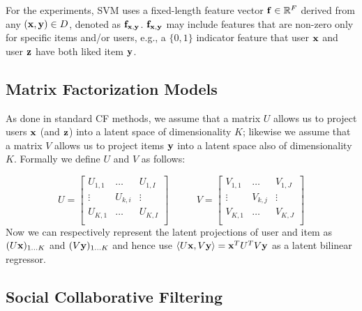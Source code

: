 For the experiments, SVM uses a fixed-length feature vector
$\mathbf{f} \in \mathbb{R}^F$ derived from any $(\mathbf{x},\mathbf{y}) \in D$, denoted
as $\mathbf{f}_{\mathbf{x},\mathbf{y}}$.  $\mathbf{f}_{\mathbf{x},\mathbf{y}}$ may include features
that are non-zero only for specific items and/or users, e.g., a $\{0,1\}$ 
indicator feature that user $\mathbf{x}$
and user $\mathbf{z}$ have both liked item $\mathbf{y}$.  

\subsection{Matrix Factorization Models}

As done in standard CF methods, we assume that
a matrix $U$ allows us to project users $\mathbf{x}$ (and $\mathbf{z}$)
into a latent space of dimensionality $K$; likewise we assume that
a matrix $V$ allows us to project items $\mathbf{y}$ into a latent
space also of dimensionality $K$.  Formally we define $U$ and $V$
as follows:

\begin{equation*}
U = 
\begin{bmatrix}
  U_{1,1} & \hdots  & U_{1,I} \\
  \vdots  & U_{k,i} & \vdots  \\
  U_{K,1} & \hdots  & U_{K,I} \\
\end{bmatrix}
\qquad \; \; \;
V = 
\begin{bmatrix}
  V_{1,1} & \hdots  & V_{1,J} \\
  \vdots  & V_{k,j} & \vdots  \\
  V_{K,1} & \hdots  & V_{K,J} \\
\end{bmatrix}
\end{equation*}
Now we can respectively represent the latent projections of user and
item as $(U \mathbf{x})_{1 \ldots K}$ and $(V \mathbf{y})_{1 \ldots K}$ and
hence use $\langle U \mathbf{x}, V \mathbf{y} \rangle = \mathbf{x}^T U^T V \mathbf{y}$ as a latent bilinear regressor. 




\subsection{Social Collaborative Filtering}

